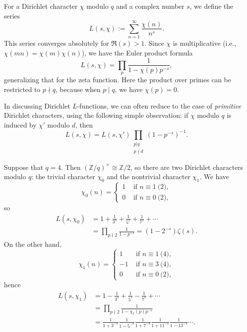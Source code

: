 \documentclass[reqno]{amsart}  \numberwithin{theorem}{section} \numberwithin{equation}{section}
\begin{document}
For a Dirichlet character $\chi$ modulo $q$ and a complex number $s$, we define the series
\begin{equation*}
L(s,\chi) := \sum_{n = 1 }^\infty \frac{\chi (n) }{ n^s}.
\end{equation*}
This series converges absolutely for $\Re(s) > 1$.  Since $\chi$ is multiplicative (i.e., $\chi (m n) = \chi (m) \chi (n)$), we have the Euler product formula
\begin{equation}\label{eq:cj579fpqu8}
L (s, \chi ) = \prod_p \frac{1}{1 - \chi (p) p^{- s}},
\end{equation}
generalizing that for the zeta function.  Here the product over primes can be restricted to $p \nmid q$, because when $p \mid q$, we have $\chi (p) = 0$.


In discussing Dirichlet $L$-functions, we can often reduce to the case of \emph{primitive} Dirichlet characters, using the following simple observation: if $\chi$ modulo $q$ is induced by $\chi '$ modulo $d$, then
\begin{equation*}
  L (s, \chi ) = L (s, \chi ') \prod_{
    \substack{
      p | q  \\
       p \nmid d
    }
  }
  (1 - p^{- s})^{-1}.
\end{equation*}
\begin{example}
  Suppose that $q = 4$.  Then $(\mathbb{Z} / q)^\times \cong \mathbb{Z} / 2$, so there are two Dirichlet characters modulo $q$: the trivial character $\chi_0$ and the nontrivial character $\chi_1$.  We have
  \begin{equation*}
\chi_0(n) =
\begin{cases}
1 &  \text{ if } n \equiv 1  \pod{2}, \\
0 & \text{ if } n \equiv 0 \pod{2},
\end{cases}
  \end{equation*}
  so
  \begin{align*}
    L(s,\chi_0) &= 1 + \frac{1}{ 3^s } + \frac{1}{5^s } + \frac{1}{7^s } + \dotsb \\
    &= \prod_{p \nmid 2} \frac{1}{1 - p^{- s}} = (1 - 2 ^{-s}) \zeta(s).
  \end{align*}
  On the other hand,
  \begin{equation*}
\chi_1 (n) =
\begin{cases}
1 & \text{ if } n \equiv 1 \pod{4}, \\
-1 & \text{ if } n \equiv 3 \pod{4}, \\
0 & \text{ if } n \equiv 0 \pod{2},
\end{cases}
  \end{equation*}
  hence
  \begin{align*}
    L (s, \chi_1 ) &= 1 - \frac{1}{3^s } + \frac{1}{5^s } - \frac{1}{7^s } + \dotsb \\
    &= \prod_{p \nmid 2} \frac{1}{1 - \chi_1(p) p^{- s}} \\
                   &= \frac{1}{1 + 3^{- s}}
                     \frac{1}{1 - 5^{- s}}
                     \frac{1}{1 + 7^{- s}} \frac{1}{1 + {11}^{- s}}
                     \frac{1}{1 - 13^{- s}} \dotsb.                     
\end{align*}
\end{example}
\end{document}
